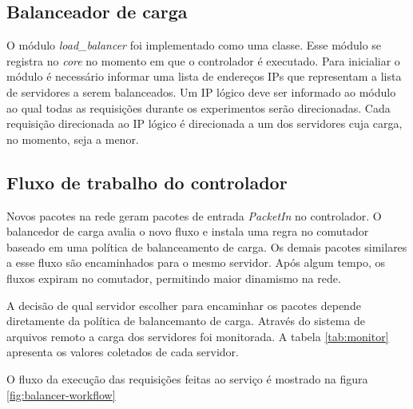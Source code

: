 \subsection{Balanceador de carga}

O módulo \emph{load\_balancer} foi implementado como uma classe.
Esse módulo se registra no \emph{core} no momento em que o controlador é 
executado.
Para inicialiar o módulo é necessário informar uma lista de endereços IPs
que representam a lista de servidores a serem balanceados.
Um IP lógico deve ser informado ao módulo ao qual todas as requisições durante
os experimentos serão direcionadas.
Cada requisição direcionada ao IP lógico é direcionada a um dos servidores 
cuja carga, no momento, seja a menor.

\subsection{Fluxo de trabalho do controlador}

Novos pacotes na rede geram pacotes de entrada \emph{PacketIn} no controlador.
O balancedor de carga avalia o novo fluxo e instala uma regra no 
comutador baseado em uma política de balanceamento de carga.
Os demais pacotes similares a esse fluxo são encaminhados para o mesmo 
servidor.
Após algum tempo, os fluxos expiram no comutador, permitindo maior 
dinamismo na rede.

A decisão de qual servidor escolher para encaminhar os pacotes depende 
diretamente da política de balancemanto de carga. 
Através do sistema de arquivos remoto a carga dos servidores foi monitorada.
A tabela \ref{tab:monitor} apresenta os valores coletados de cada servidor.



O fluxo da execução das requisições feitas ao serviço é mostrado na figura
\ref{fig:balancer-workflow}

